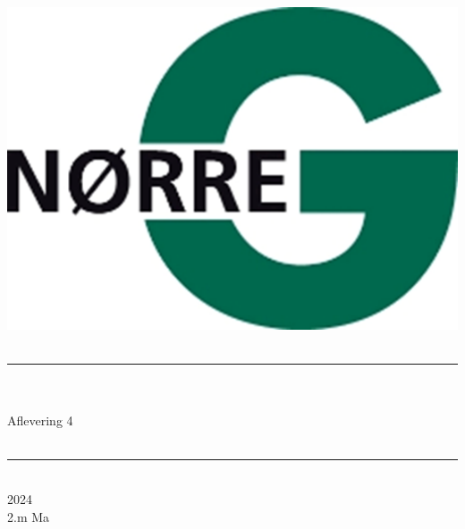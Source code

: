 \documentclass[12pt,x11names,a4paper]{article}
\begin{document}
%

\begin{titlepage}

\begin{minipage}{0.27\textwidth}

\end{minipage}
\begin{minipage}{0.73\textwidth}
\begin{center}
\phantom{h} \vspace{1cm}\\
\hspace{4cm}
\includegraphics[scale = 1]{Billeder/Norreg.png} \\
\phantom{h} \vspace{5cm}\\
\rule{0.7\textwidth}{0.3mm}\\
\phantom{h}\\
{\fontsize{50}{60}\selectfont Aflevering 4}\\
\phantom{h}\\
\rule{0.7\textwidth}{0.3mm}\\
\Large 2024\\
\Large 2.m Ma

\end{center}
\end{minipage}
\end{titlepage}
\end{document}
